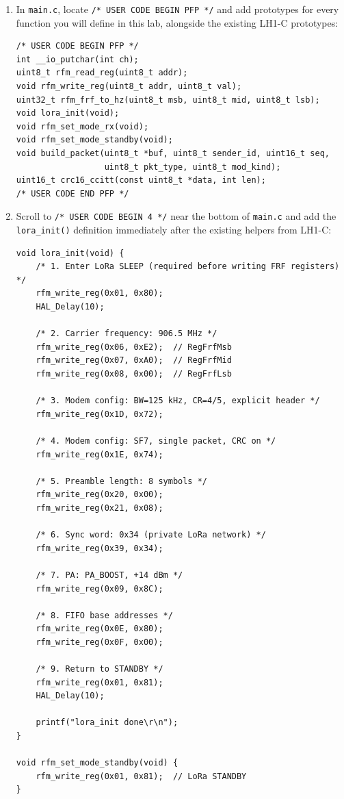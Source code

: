 \documentclass[11pt,letterpaper]{article}
\begin{document}
\begin{enumerate}[leftmargin=2em]
	\item In \texttt{main.c}, locate \texttt{/* USER CODE BEGIN PFP */} and add prototypes for every function you will define in this lab, alongside the existing LH1-C prototypes:
\begin{verbatim}
/* USER CODE BEGIN PFP */
int __io_putchar(int ch);
uint8_t rfm_read_reg(uint8_t addr);
void rfm_write_reg(uint8_t addr, uint8_t val);
uint32_t rfm_frf_to_hz(uint8_t msb, uint8_t mid, uint8_t lsb);
void lora_init(void);
void rfm_set_mode_rx(void);
void rfm_set_mode_standby(void);
void build_packet(uint8_t *buf, uint8_t sender_id, uint16_t seq,
                  uint8_t pkt_type, uint8_t mod_kind);
uint16_t crc16_ccitt(const uint8_t *data, int len);
/* USER CODE END PFP */
\end{verbatim}

	\item Scroll to \texttt{/* USER CODE BEGIN 4 */} near the bottom of \texttt{main.c} and add the \texttt{lora\_init()} definition immediately after the existing helpers from LH1-C:
\begin{verbatim}
void lora_init(void) {
    /* 1. Enter LoRa SLEEP (required before writing FRF registers) */
    rfm_write_reg(0x01, 0x80);
    HAL_Delay(10);

    /* 2. Carrier frequency: 906.5 MHz */
    rfm_write_reg(0x06, 0xE2);  // RegFrfMsb
    rfm_write_reg(0x07, 0xA0);  // RegFrfMid
    rfm_write_reg(0x08, 0x00);  // RegFrfLsb

    /* 3. Modem config: BW=125 kHz, CR=4/5, explicit header */
    rfm_write_reg(0x1D, 0x72);

    /* 4. Modem config: SF7, single packet, CRC on */
    rfm_write_reg(0x1E, 0x74);

    /* 5. Preamble length: 8 symbols */
    rfm_write_reg(0x20, 0x00);
    rfm_write_reg(0x21, 0x08);

    /* 6. Sync word: 0x34 (private LoRa network) */
    rfm_write_reg(0x39, 0x34);

    /* 7. PA: PA_BOOST, +14 dBm */
    rfm_write_reg(0x09, 0x8C);

    /* 8. FIFO base addresses */
    rfm_write_reg(0x0E, 0x80);
    rfm_write_reg(0x0F, 0x00);

    /* 9. Return to STANDBY */
    rfm_write_reg(0x01, 0x81);
    HAL_Delay(10);

    printf("lora_init done\r\n");
}

void rfm_set_mode_standby(void) {
    rfm_write_reg(0x01, 0x81);  // LoRa STANDBY
}


\end{verbatim}
\end{enumerate}
\end{document}
